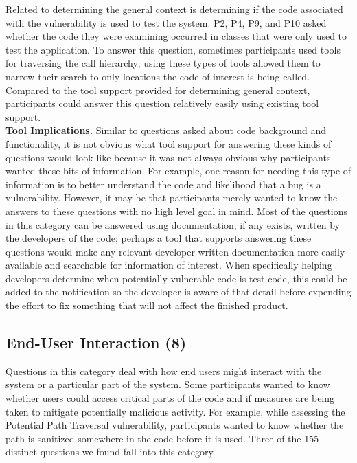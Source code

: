 \documentclass[conference]{IEEEtran}
\begin{document}
Related to determining the general context is determining if the code associated with the vulnerability is used to test the system. 
P2, P4, P9, and P10 asked whether the code they were examining occurred in classes that were only used to test the application. 
To answer this question, sometimes participants used tools for traversing the call hierarchy; using these types of tools allowed them to narrow their search to only locations the code of interest is being called.
Compared to the tool support provided for determining general context, participants could answer this question relatively easily using existing tool support.
\\

\noindent\textbf{Tool Implications.}
Similar to questions asked about code background and functionality, it is not obvious what tool support for answering these kinds of questions would look like because it was not always obvious why participants wanted these bits of information. 
For example, one reason for needing this type of information is to better understand the code and likelihood that a bug is a vulnerability. 
However, it may be that participants merely wanted to know the answers to these questions with no high level goal in mind.
Most of the questions in this category can be answered using documentation, if any exists, written by the developers of the code; perhaps a tool that supports answering these questions would make any relevant developer written documentation more easily available and searchable for information of interest.
When specifically helping developers determine when potentially vulnerable code is test code, this could be added to the notification so the developer is aware of that detail before expending the effort to fix something that will not affect the finished product.



\noindent\subsection{\textbf{End-User Interaction (8)}}
\label{eui}


Questions in this category deal with how end users might interact with the system or a particular part of the system. 
Some participants wanted to know whether users could access critical parts of the code and if measures are being taken to mitigate potentially malicious activity. 
For example, while assessing the Potential Path Traversal vulnerability, participants wanted to know whether the path is sanitized somewhere in the code before it is used.
Three of the 155 distinct questions we found fall into this category.
\\
\end{document}
